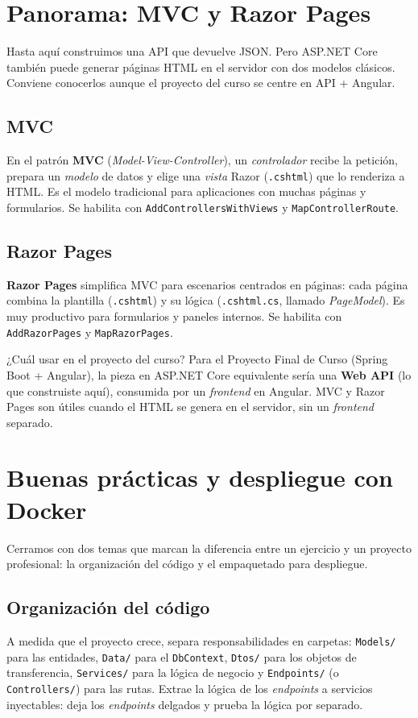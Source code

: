 \documentclass[11pt]{article}
\begin{document}
\section{Panorama: MVC y Razor Pages}
Hasta aquí construimos una API que devuelve JSON. Pero ASP.NET Core también puede generar páginas HTML en el servidor con dos modelos clásicos. Conviene conocerlos aunque el proyecto del curso se centre en API + Angular.

\subsection{MVC}
En el patrón \textbf{MVC} (\emph{Model-View-Controller}), un \emph{controlador} recibe la petición, prepara un \emph{modelo} de datos y elige una \emph{vista} Razor (\texttt{.cshtml}) que lo renderiza a HTML. Es el modelo tradicional para aplicaciones con muchas páginas y formularios. Se habilita con \texttt{AddControllersWithViews} y \texttt{MapControllerRoute}.

\subsection{Razor Pages}
\textbf{Razor Pages} simplifica MVC para escenarios centrados en páginas: cada página combina la plantilla (\texttt{.cshtml}) y su lógica (\texttt{.cshtml.cs}, llamado \emph{PageModel}). Es muy productivo para formularios y paneles internos. Se habilita con \texttt{AddRazorPages} y \texttt{MapRazorPages}.

\begin{cajatip}{¿Cuál usar en el proyecto del curso?}
Para el Proyecto Final de Curso (Spring Boot + Angular), la pieza en ASP.NET Core equivalente sería una \textbf{Web API} (lo que construiste aquí), consumida por un \emph{frontend} en Angular. MVC y Razor Pages son útiles cuando el HTML se genera en el servidor, sin un \emph{frontend} separado.\par
\end{cajatip}

\section{Buenas prácticas y despliegue con Docker}
Cerramos con dos temas que marcan la diferencia entre un ejercicio y un proyecto profesional: la organización del código y el empaquetado para despliegue.

\subsection{Organización del código}
A medida que el proyecto crece, separa responsabilidades en carpetas: \texttt{Models/} para las entidades, \texttt{Data/} para el \texttt{DbContext}, \texttt{Dtos/} para los objetos de transferencia, \texttt{Services/} para la lógica de negocio y \texttt{Endpoints/} (o \texttt{Controllers/}) para las rutas. Extrae la lógica de los \emph{endpoints} a servicios inyectables: deja los \emph{endpoints} delgados y prueba la lógica por separado.
\end{document}
